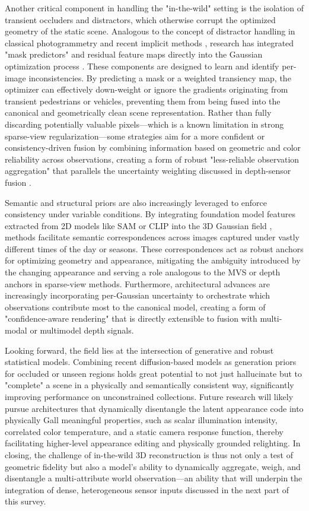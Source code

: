 \documentclass[11pt,a4paper]{article}
\begin{document}
Another critical component in handling the "in-the-wild" setting is the isolation of transient occluders and distractors, which otherwise corrupt the optimized geometry of the static scene. Analogous to the concept of distractor handling in classical photogrammetry and recent implicit methods \cite{arxiv:2303.16509v2}, research has integrated "mask predictors" and residual feature maps directly into the Gaussian optimization process \cite{arxiv:2403.16964v1}. These components are designed to learn and identify per-image inconsistencies. By predicting a mask or a weighted transiency map, the optimizer can effectively down-weight or ignore the gradients originating from transient pedestrians or vehicles, preventing them from being fused into the canonical and geometrically clean scene representation. Rather than fully discarding potentially valuable pixels---which is a known limitation in strong sparse-view regularization---some strategies aim for a more confident or consistency-driven fusion by combining information based on geometric and color reliability across observations, creating a form of robust "less-reliable observation aggregation" that parallels the uncertainty weighting discussed in depth-sensor fusion \cite{arxiv:2404.10484v1}.

Semantic and structural priors are also increasingly leveraged to enforce consistency under variable conditions. By integrating foundation model features extracted from 2D models like SAM or CLIP into the 3D Gaussian field \cite{arxiv:2403.16964v1}, methods facilitate semantic correspondences across images captured under vastly different times of the day or seasons. These correspondences act as robust anchors for optimizing geometry and appearance, mitigating the ambiguity introduced by the changing appearance and serving a role analogous to the MVS or depth anchors in sparse-view methods. Furthermore, architectural advances are increasingly incorporating per-Gaussian uncertainty to orchestrate which observations contribute most to the canonical model, creating a form of "confidence-aware rendering" that is directly extensible to fusion with multi-modal or multimodel depth signals.

Looking forward, the field lies at the intersection of generative and robust statistical models. Combining recent diffusion-based models as generation priors for occluded or unseen regions holds great potential to not just hallucinate but to "complete" a scene in a physically and semantically consistent way, significantly improving performance on unconstrained collections. Future research will likely pursue architectures that dynamically disentangle the latent appearance code into physically Gall meaningful properties, such as scalar illumination intensity, correlated color temperature, and a static camera response function, thereby facilitating higher-level appearance editing and physically grounded relighting. In closing, the challenge of in-the-wild 3D reconstruction is thus not only a test of geometric fidelity but also a model's ability to dynamically aggregate, weigh, and disentangle a multi-attribute world observation---an ability that will underpin the integration of dense, heterogeneous sensor inputs discussed in the next part of this survey.
\end{document}
